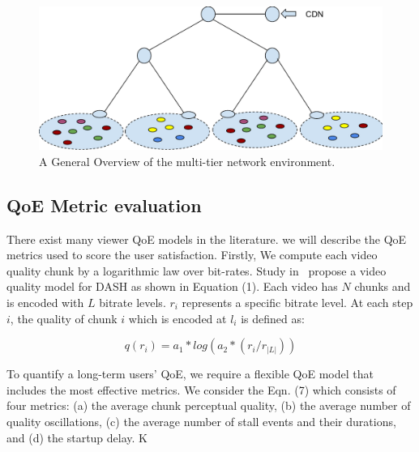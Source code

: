 \begin{figure}
    \centering
    \includegraphics[width=0.9\linewidth]{images/exp-setup-scenario.pdf}
    \caption{A General Overview of the multi-tier network environment.}
    \label{fig:exp-setup-scenario}
\end{figure}



\subsection{QoE Metric evaluation}

There exist many viewer QoE models in the literature. we will describe the QoE metrics used to score the user satisfaction. Firstly, We compute each video quality chunk by a logarithmic law over bit-rates. Study in~ propose a video quality model for DASH as shown in Equation (1). Each video has $N$ chunks and is encoded with $L$ bitrate levels. $r_i$ represents a specific bitrate level. At each step $i$, the quality of chunk $i$ which is encoded at $l_i$ is defined as:

$$
q(r_i) = a_1 * log(a_2 * (r_i/ r_{|L|}))
$$

To quantify a long-term users' QoE, we require a flexible QoE model that includes the most effective metrics. 
We consider the Eqn. (7) which consists of four metrics: (a) the average chunk perceptual quality, (b) the average number of quality oscillations, (c) the average number of stall events and their durations, and (d) the startup delay. K

